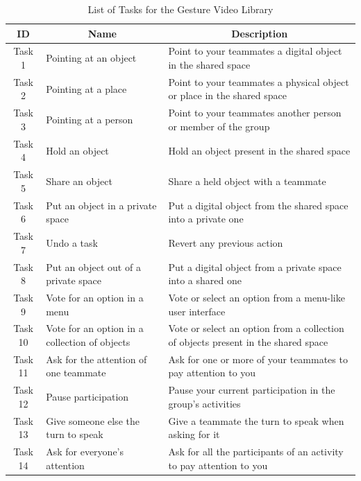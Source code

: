 \begin{table}[]
    \caption{List of Tasks for the Gesture Video Library}
\begin{tabularx}{\textwidth}{@{}cXX@{}}
\toprule
\textbf{ID} & \multicolumn{1}{c}{\textbf{Name}}             & \multicolumn{1}{c}{\textbf{Description}}                                          \\ \midrule
Task 1      & Pointing at an object                         & Point to your teammates a digital object in   the shared space                    \\
Task 2      & Pointing at a place                           & Point to your teammates a physical object or place in the shared space            \\
Task 3      & Pointing at a person                          & Point to your teammates another person or member of the group                     \\
Task 4      & Hold an object                                & Hold an object present in the shared space                                        \\
Task 5      & Share an object                               & Share a held object with a teammate                                               \\
Task 6      & Put an object in a private space              & Put a digital object from the shared space into a private one                     \\
Task 7      & Undo a task                                   & Revert any previous action                                                        \\
Task 8      & Put an object out of a private space          & Put a digital object from a private space into a shared one                       \\
Task 9      & Vote for an option in a menu                  & Vote or select an option from a menu-like user interface                          \\
Task 10     & Vote for an option in a collection of objects & Vote or select an option from a collection of objects present in the shared space \\
Task 11     & Ask for the attention of one teammate         & Ask for one or more of your teammates to pay attention to you                     \\
Task 12     & Pause participation                           & Pause your current participation in the group’s activities                        \\
Task 13     & Give someone else the turn to speak           & Give a teammate the turn to speak when asking for it                              \\
Task 14     & Ask for everyone's attention                  & Ask for all the participants of an activity to pay attention to you               \\ \bottomrule
\end{tabularx}
\label{tab:B-1}
\end{table}